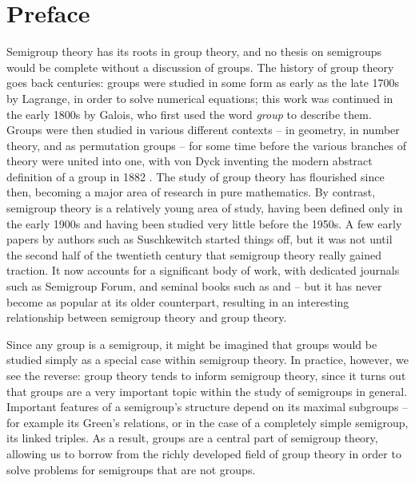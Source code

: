 \chapter*{Preface}

Semigroup theory has its roots in group theory, and no thesis on semigroups
would be complete without a discussion of groups.  The history of group theory
goes back centuries: groups were studied in some form as early as the late 1700s
by Lagrange, in order to solve numerical equations; this work was continued in
the early 1800s by Galois, who first used the word \textit{group} to describe
them.  Groups were then studied in various different contexts -- in geometry, in
number theory, and as permutation groups -- for some time before the various
branches of theory were united into one, with von Dyck inventing the modern
abstract definition of a group in 1882 \cite{dyck_1882}.  The study of group
theory has flourished since then, becoming a major area of research in pure
mathematics.  By contrast, semigroup theory is a relatively young area of study,
having been defined only in the early 1900s and having been studied very little
before the 1950s.  A few early papers by authors such as Suschkewitch
\cite{susch_1928} started things off, but it was not until the second half of
the twentieth century that semigroup theory really gained traction.  It now
accounts for a significant body of work, with dedicated journals such as
Semigroup Forum, and seminal books such as \cite{howie} and \cite{petrich} --
but it has never become as popular at its older counterpart, resulting in an
interesting relationship between semigroup theory and group theory.

Since any group is a semigroup, it might be imagined that groups would be
studied simply as a special case within semigroup theory.  In practice, however,
we see the reverse: group theory tends to inform semigroup theory, since it
turns out that groups are a very important topic within the study of semigroups
in general.  Important features of a semigroup's structure depend on its maximal
subgroups -- for example its Green's relations, or in the case of a completely
simple semigroup, its linked triples.  As a result, groups are a central part of
semigroup theory, allowing us to borrow from the richly developed field of group
theory in order to solve problems for semigroups that are not groups.

